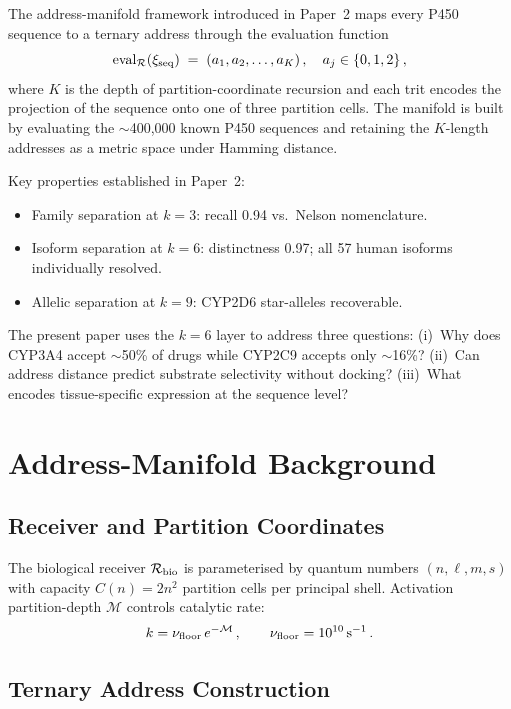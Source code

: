 ﻿\documentclass[11pt,twocolumn,a4paper]{article}
\theoremstyle{definition}
\theoremstyle{remark}
\newcommand{\Recv}{\mathcal{R}}
\newcommand{\eval}{\mathrm{eval}}
\newcommand{\Sexp}{\xi}
\newcommand{\depth}{\mathcal{M}}
\begin{document}
The address-manifold framework introduced in Paper~2 \citep{sachikonye2026manifold}
maps every P450 sequence to a ternary address through the evaluation function
\begin{equation}
  \eval_\Recv(\Sexp_{\rm seq}) \;=\; (a_1,a_2,\ldots,a_K)\,,\quad a_j\in\{0,1,2\}\,,
\end{equation}
where $K$ is the depth of partition-coordinate recursion and each trit encodes
the projection of the sequence onto one of three partition cells. The manifold
is built by evaluating the $\sim$400{,}000 known P450 sequences and retaining
the $K$-length addresses as a metric space under Hamming distance.

Key properties established in Paper~2:
\begin{itemize}
\item Family separation at $k{=}3$: recall 0.94 vs.\ Nelson nomenclature.
\item Isoform separation at $k{=}6$: distinctness 0.97; all 57 human isoforms
      individually resolved.
\item Allelic separation at $k{=}9$: CYP2D6 star-alleles recoverable.
\end{itemize}

The present paper uses the $k{=}6$ layer to address three questions:
(i)~Why does CYP3A4 accept $\sim$50\% of drugs while CYP2C9 accepts only
$\sim$16\%?
(ii)~Can address distance predict substrate selectivity without docking?
(iii)~What encodes tissue-specific expression at the sequence level?

\section{Address-Manifold Background}
\label{sec:background}

\subsection{Receiver and Partition Coordinates}

The biological receiver $\Recv_{\rm bio}$ is parameterised by quantum numbers
$(n,\ell,m,s)$ with capacity $C(n)=2n^2$ partition cells per principal shell.
Activation partition-depth $\depth$ controls catalytic rate:
\begin{equation}
  k = \nu_{\rm floor}\,e^{-\depth}\,, \qquad \nu_{\rm floor} = 10^{10}\,\mathrm{s}^{-1}\,.
\end{equation}

\subsection{Ternary Address Construction}
\end{document}
